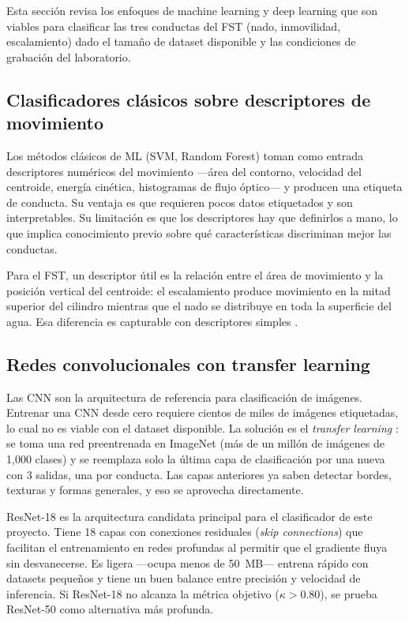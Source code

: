 Esta sección revisa los enfoques de machine learning y deep learning que son viables
para clasificar las tres conductas del FST (nado, inmovilidad, escalamiento) dado el
tamaño de dataset disponible y las condiciones de grabación del laboratorio.

\subsection{Clasificadores clásicos sobre descriptores de movimiento}

Los métodos clásicos de ML (SVM, Random Forest) toman como entrada descriptores
numéricos del movimiento ---área del contorno, velocidad del centroide, energía cinética,
histogramas de flujo óptico--- y producen una etiqueta de conducta. Su ventaja es que
requieren pocos datos etiquetados y son interpretables. Su limitación es que los
descriptores hay que definirlos a mano, lo que implica conocimiento previo sobre qué
características discriminan mejor las conductas.

Para el FST, un descriptor útil es la relación entre el área de movimiento y la posición
vertical del centroide: el escalamiento produce movimiento en la mitad superior del
cilindro mientras que el nado se distribuye en toda la superficie del agua. Esa
diferencia es capturable con descriptores simples \cite{armario2021}.

\subsection{Redes convolucionales con transfer learning}

Las CNN \cite{lecun1998} son la arquitectura de referencia para clasificación de
imágenes. Entrenar una CNN desde cero requiere cientos de miles de imágenes etiquetadas,
lo cual no es viable con el dataset disponible. La solución es el \textit{transfer
learning} \cite{pan2010}: se toma una red preentrenada en ImageNet (más de un millón
de imágenes de 1{,}000 clases) y se reemplaza solo la última capa de clasificación por
una nueva con 3 salidas, una por conducta. Las capas anteriores ya saben detectar bordes,
texturas y formas generales, y eso se aprovecha directamente.

ResNet-18 \cite{he2016} es la arquitectura candidata principal para el clasificador de
este proyecto. Tiene 18 capas con conexiones residuales (\textit{skip connections}) que
facilitan el entrenamiento en redes profundas al permitir que el gradiente fluya sin
desvanecerse. Es ligera ---ocupa menos de 50~MB--- entrena rápido con datasets pequeños
y tiene un buen balance entre precisión y velocidad de inferencia. Si ResNet-18 no
alcanza la métrica objetivo ($\kappa > 0.80$), se prueba ResNet-50 como alternativa más
profunda.

